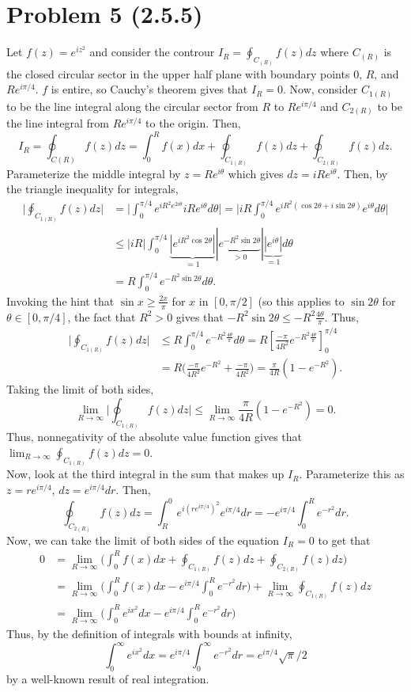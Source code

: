 \documentclass{article}
\begin{document}
\section{Problem 5 (2.5.5)}
Let $f(z)= e^{iz^2}$ and consider the controur $I_R=\oint_{C_{(R)}} f(z)dz$ where $C_{(R)}$ is the closed circular sector in the upper half plane with boundary points 0, $R$, and $Re^{i\pi/4}$. $f$ is entire, so Cauchy's theorem gives that $I_R=0$. Now, consider $C_{1(R)}$ to be the line integral along the circular sector from $R$ to $Re^{i\pi/4}$ and $C_{2(R)}$ to be the line integral from $Re^{i\pi/4}$ to the origin. Then, 
\[
I_R=\oint_{C(R)} f(z)dz=\int_0^R f(x)dx +\oint_{C_{1(R)}} f(z)dz+\oint_{C_{2(R)}} f(z)dz.
\]
Parameterize the middle integral by $z=Re^{i\theta}$ which gives $dz=iRe^{i\theta}$. Then, by the triangle inequality for integrals, 
\[
\begin{split}
\bigg|\oint_{C_{1(R)}}f(z)dz\bigg|&=\bigg|\int_0^{\pi/4}e^{iR^2e^{2i\theta}}iRe^{i\theta}d\theta\bigg|=\bigg|iR\int_0^{\pi/4}e^{iR^2(\cos{2\theta}+i\sin{2\theta})}e^{i\theta}d\theta\bigg|\\&\leq
|iR|\int_0^{\pi/4}\underbrace{|e^{iR^2\cos{2\theta}}|}_{=1}|\underbrace{e^{-R^2\sin{2\theta}}}_{>0}|\underbrace{|e^{i\theta}|}_{=1}d\theta\\&=
R\int_0^{\pi/4}e^{-R^2\sin{2\theta}}d\theta.
\end{split}
\]
Invoking the hint that $\sin{x}\geq \frac{2x}{\pi}$ for $x$ in $[0,\pi/2]$ (so this applies to $\sin{2\theta}$ for $\theta\in[0,\pi/4]$, the fact that $R^2>0$ gives that $-R^2\sin{2\theta}\leq -R^2\frac{4\theta}{\pi}$. Thus,
\[
\begin{split}
\bigg|\oint_{C_{1(R)}}f(z)dz\bigg|&\leq R\int_0^{\pi/4}e^{-R^2\frac{4\theta}{\pi}}d\theta=R\left[\frac{-\pi}{4R^2}e^{-R^2\frac{4\theta}{\pi}}\right]_0^{\pi/4}\\&=
R\bigg(\frac{-\pi}{4R^2}e^{-R^2}+\frac{-\pi}{4R^2}\bigg)=\frac{\pi}{4R}(1-e^{-R^2}).
\end{split}
\]
Taking the limit of both sides, 
\[
\lim_{R\to\infty}\bigg|\oint_{C_{1(R)}}f(z)dz\bigg|\leq\lim_{R\to\infty}\frac{\pi}{4R}(1-e^{-R^2})=0. 
\]
Thus, nonnegativity of the absolute value function gives that $\lim_{R\to\infty}\oint_{C_{1(R)}}f(z)dz=0$. \\
Now, look at the third integral in the sum that makes up $I_R$. Parameterize this as $z=re^{i\pi/4}$, $dz=e^{i\pi/4}dr$. Then, 
\[
\oint_{C_{2(R)}} f(z)dz=\int_R^0e^{i(re^{i\pi/4})^2}e^{i\pi/4}dr=-e^{i\pi/4}\int_0^Re^{-r^2}dr.
\]
Now, we can take the limit of both sides of the equation $I_R=0$ to get that
\[
\begin{split}
0&=\lim_{R\to\infty}\bigg(\int_0^R f(x)dx +\oint_{C_{1(R)}} f(z)dz+\oint_{C_{2(R)}} f(z)dz\bigg)\\&=
\lim_{R\to\infty}\bigg(\int_0^Rf(x)dx-e^{i\pi/4}\int_0^Re^{-r^2}dr\bigg)+\lim_{R\to\infty}\oint_{C_{1(R)}}f(z)dz\\&=
\lim_{R\to\infty}\bigg(\int_0^Re^{ix^2}dx-e^{i\pi/4}\int_0^Re^{-r^2}dr\bigg)
\end{split}
\]
Thus, by the definition of integrals with bounds at infinity,
\[
\int_0^{\infty}e^{ix^2}dx=e^{i\pi/4}\int_0^\infty e^{-r^2}dr=e^{i\pi/4}\sqrt{\pi}/2
\]
by a well-known result of real integration.
\end{document}
